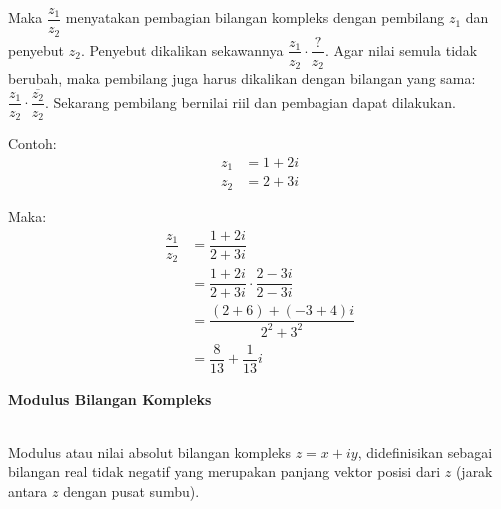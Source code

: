 \documentclass{article}
\begin{document}
\begin{enumerate}
          Maka $\dfrac{z_1}{z_2}$ menyatakan pembagian bilangan kompleks dengan pembilang $z_1$ dan penyebut $z_2$. Penyebut dikalikan sekawannya $\dfrac{z_1}{z_2} \cdot \dfrac{?}{z_2}$. Agar nilai semula tidak berubah, maka pembilang juga harus dikalikan dengan bilangan yang sama: $\dfrac{z_1}{z_2} \cdot \dfrac{\overline{z_2}}{z_2}$. Sekarang pembilang bernilai riil dan pembagian dapat dilakukan.

          \newpage
          Contoh:
          \begin{align}
              z_1 & = 1 + 2i
              \nonumber      \\
              z_2 & = 2 + 3i
              \nonumber
          \end{align}

          Maka:
          \begin{align}
              \dfrac{z_1}{z_2} & = \dfrac{1+2i}{2+3i}
              \nonumber                                                        \\
                               & = \dfrac{1+2i}{2+3i} \cdot \dfrac{2-3i}{2-3i}
              \nonumber                                                        \\
                               & = \dfrac{(2+6)+(-3+4)i}{2^2+3^2}
              \nonumber                                                        \\
                               & = \dfrac{8}{13} + \dfrac{1}{13}i
              \nonumber
          \end{align}
\end{enumerate}



\newpage
\begin{center}
    \textbf{Modulus Bilangan Kompleks}
\end{center}
\leavevmode\\

Modulus atau nilai absolut bilangan kompleks $ z = x + iy $, didefinisikan sebagai bilangan real tidak negatif yang merupakan panjang vektor posisi dari $z$ (jarak antara $z$ dengan pusat sumbu).
\\ \\

\\ \\
\end{document}
